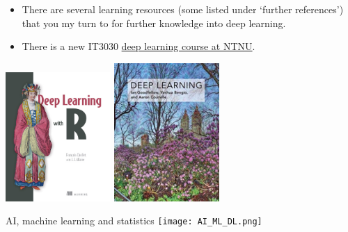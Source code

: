 \documentclass[
  10pt,
  ignorenonframetext,
  twocolumn]{beamer}
\providecommand{\tightlist}{%
  \setlength{\itemsep}{0pt}\setlength{\parskip}{0pt}}
\begin{document}
\begin{frame}
\begin{itemize}
\tightlist
\item
  There are several learning resources (some listed under `further
  references') that you my turn to for further knowledge into deep
  learning.
\item
  There is a new IT3030
  \href{https://www.ntnu.no/studier/emner/IT3030\#tab=omEmnet}{deep
  learning course at NTNU}.
\end{itemize}

\centering

\includegraphics[width=0.3\textwidth,height=\textheight]{DeepLearningwithR.jpeg}
\includegraphics[width=0.3\textwidth,height=\textheight]{DeepLearning.jpeg}
\end{frame}

\begin{frame}
\begin{block}{AI, machine learning and statistics}
\label{ai-machine-learning-and-statistics}
\texttt{[image: AI\_ML\_DL.png]}
\end{block}
\end{frame}
\end{document}
